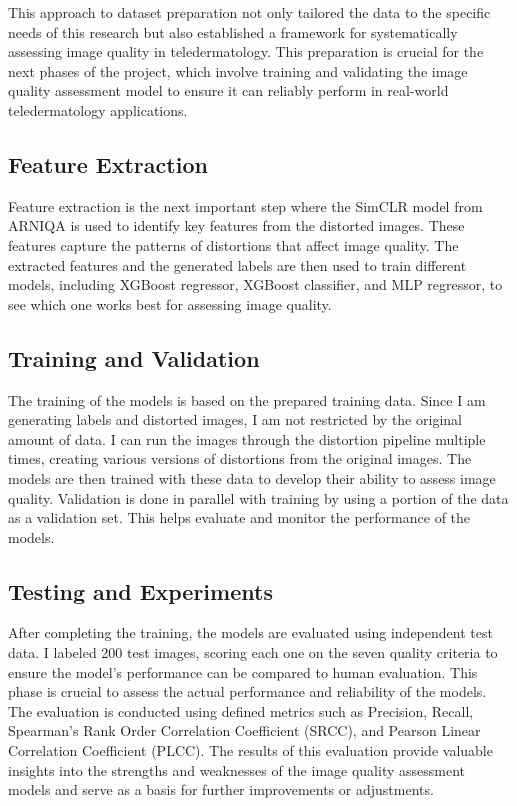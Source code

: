 \vspace{\baselineskip}
\noindent
This approach to dataset preparation not only tailored the data to the specific needs of this research but also established a framework for systematically assessing image quality in teledermatology. This preparation is crucial for the next phases of the project, which involve training and validating the image quality assessment model to ensure it can reliably perform in real-world teledermatology applications. \par

\subsection{Feature Extraction}
\label{sub:FeatureExtraction}
Feature extraction is the next important step where the SimCLR model from ARNIQA is used to identify key features from the distorted images. These features capture the patterns of distortions that affect image quality. The extracted features and the generated labels are then used to train different models, including XGBoost regressor, XGBoost classifier, and MLP regressor, to see which one works best for assessing image quality. \par

\subsection{Training and Validation}
\label{sub:TrainVal}
The training of the models is based on the prepared training data. Since I am generating labels and distorted images, I am not restricted by the original amount of data. I can run the images through the distortion pipeline multiple times, creating various versions of distortions from the original images. The models are then trained with these data to develop their ability to assess image quality. Validation is done in parallel with training by using a portion of the data as a validation set. This helps evaluate and monitor the performance of the models. \par 


\subsection{Testing and Experiments}
\label{sub:TestExperiment}
After completing the training, the models are evaluated using independent test data. I labeled 200 test images, scoring each one on the seven quality criteria to ensure the model’s performance can be compared to human evaluation. This phase is crucial to assess the actual performance and reliability of the models. The evaluation is conducted using defined metrics such as Precision, Recall, Spearman’s Rank Order Correlation Coefficient (SRCC), and Pearson Linear Correlation Coefficient (PLCC). The results of this evaluation provide valuable insights into the strengths and weaknesses of the image quality assessment models and serve as a basis for further improvements or adjustments. \par 

